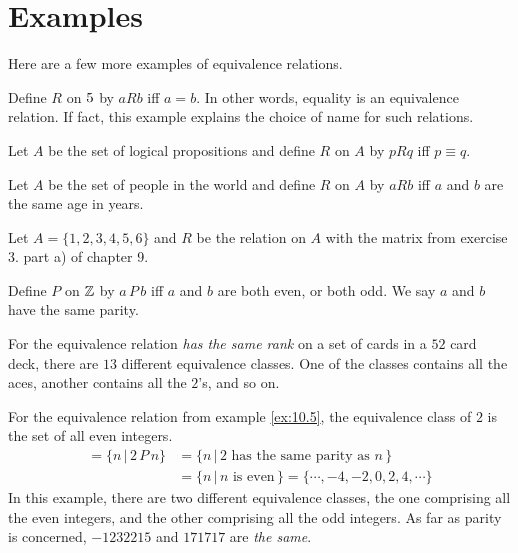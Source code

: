 \section{Examples}
Here are a few more examples of equivalence relations.

\begin{exmp}
Define $R$ on $5$ by $aRb$ iff $a=b$. In other words, equality is an 
equivalence relation. 
If fact, this example explains the choice of name for such relations. 
\end{exmp}

\begin{exmp} 
Let $A$ be the set of logical propositions and define $R$ on $A$ by
$pRq$ iff $p\equiv q$. 
\end{exmp}

\begin{exmp}  
Let $A$ be the set of people in the world and define $R$ on $A$ 
by $aRb$ iff $a$ and $b$ are the same age in years.
\end{exmp}

\begin{exmp} 
Let $A=\{1,2,3,4,5,6\}$ and $R$ be the relation on $A$ with the 
matrix from exercise 3. part a) of chapter 9.
\end{exmp}

\begin{exmp}\label{ex:10.5} 
Define $P$ on $\mathbb{Z}$ by $a\,P\,b$ iff $a$ and $b$ are
both even, or both odd. We say $a$ and $b$ have the same parity.
\end{exmp}


For the equivalence relation {\itshape has the same rank} on a set of cards
in a $52$ card deck, there are $13$ different equivalence classes. One of the classes
contains all the aces, another contains all the $2$'s, and so on.

\clearpage
\begin{exmp}
 For the equivalence relation from example \ref{ex:10.5}, the equivalence class of $2$ is the
 set of all even integers. 
 \begin{align*}
  [2] = \{ n\,|\, 2\,P\,n\} &=\{ n\,|\, 2 \text{ has the same parity as } n\,\} \\
                            &= \{ n\,|\, n \text{ is even}\,\} = \{ \cdots, -4, -2,0,2,4, \cdots\}
 \end{align*}
 In this example, there are two different equivalence classes, the one comprising
 all the even integers, and the other comprising all the odd integers. As far
 as parity is concerned, $-1232215$ and $171717$ are {\itshape the same}.
\end{exmp}


